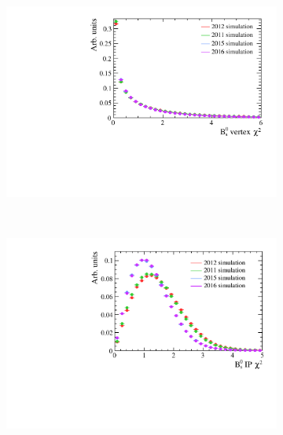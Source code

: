 \begin{figure}
 \begin{subfigure}[b]{0.48\textwidth}
        \includegraphics[width=\textwidth]{./Figs/Selection/signal_end_vertex.pdf}
    \end{subfigure}
    ~ %
    \begin{subfigure}[b]{0.48\textwidth}
       \includegraphics[width=\textwidth]{./Figs/Selection/signal_IPS.pdf}
    \end{subfigure}






\end{figure}
